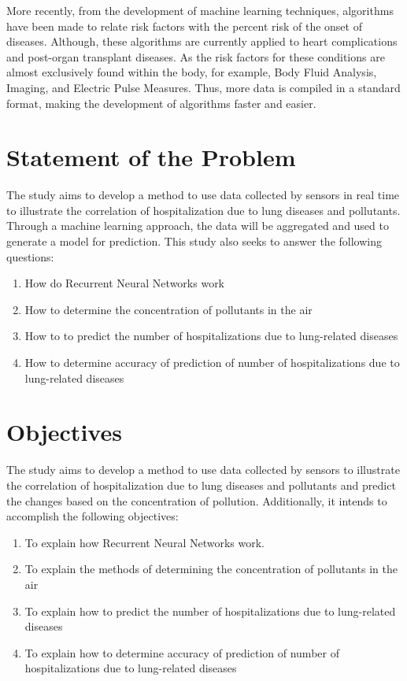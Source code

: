 \documentclass[10pt,11pt,12pt,oneside]{book}
\begin{document}
    More recently, from the development of machine learning techniques, algorithms have been made to relate risk factors with the percent risk of the onset of diseases. Although, these algorithms are currently applied to heart complications and post-organ transplant diseases. As the risk factors for these conditions are almost exclusively found within the body, for example, Body Fluid Analysis, Imaging, and Electric Pulse Measures. Thus, more data is compiled in a standard format, making the development of algorithms faster and easier.
    \section{Statement of the Problem}

    The study aims to develop a method to use data collected by sensors in real time to illustrate the correlation of hospitalization due to lung diseases and pollutants. Through a machine learning approach, the data will be aggregated and used to generate a model for prediction. This study also seeks to answer the following questions:
    \begin{enumerate}
        \item How do Recurrent Neural Networks work
        \item How to determine the concentration of pollutants in the air
        \item How to to predict the number of hospitalizations due to lung-related diseases
        \item How to determine accuracy of prediction of number of hospitalizations due to lung-related diseases
    \end{enumerate}
    \section{Objectives}
    The study aims to develop a method to use data collected by sensors to illustrate the correlation of hospitalization due to lung diseases and pollutants and predict the changes based on the concentration of pollution. Additionally, it intends to accomplish the following objectives:
    \begin{enumerate}
        \item To explain how Recurrent Neural Networks work.
        \item To explain the methods of determining the concentration of pollutants in the air
        \item To explain how to predict the number of hospitalizations due to lung-related diseases
        \item To explain how to determine accuracy of prediction of number of hospitalizations due to lung-related diseases
    \end{enumerate}
\end{document}

